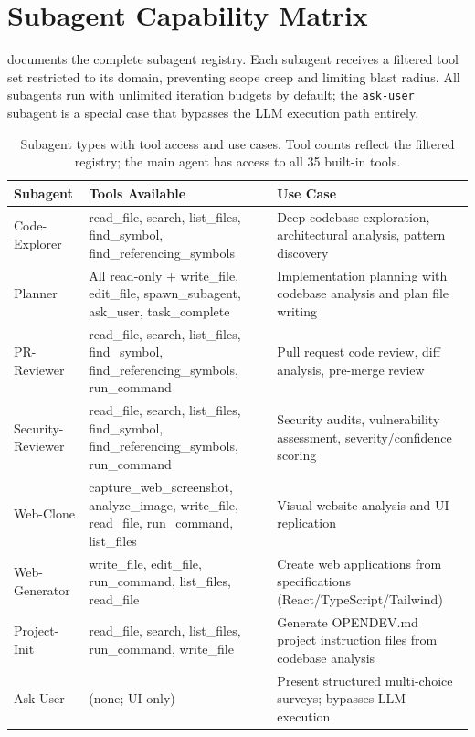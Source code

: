 \section{Subagent Capability Matrix}
\label{app:subagents}

 documents the complete subagent registry. Each subagent receives a filtered tool set restricted to its domain, preventing scope creep and limiting blast radius. All subagents run with unlimited iteration budgets by default; the \texttt{ask-user} subagent is a special case that bypasses the LLM execution path entirely.

\begin{table}[h]
\centering
\caption{Subagent types with tool access and use cases. Tool counts reflect the filtered registry; the main agent has access to all 35 built-in tools.}
\label{tab:subagents}
\footnotesize
\begin{tabular}{@{}lp{4.5cm}p{4.5cm}@{}}
\toprule
\textbf{Subagent} & \textbf{Tools Available} & \textbf{Use Case} \\
\midrule
Code-Explorer & read\_file, search, list\_files, find\_symbol, find\_referencing\_symbols & Deep codebase exploration, architectural analysis, pattern discovery \\
\addlinespace
Planner & All read-only + write\_file, edit\_file, spawn\_subagent, ask\_user, task\_complete & Implementation planning with codebase analysis and plan file writing \\
\addlinespace
PR-Reviewer & read\_file, search, list\_files, find\_symbol, find\_referencing\_symbols, run\_command & Pull request code review, diff analysis, pre-merge review \\
\addlinespace
Security-Reviewer & read\_file, search, list\_files, find\_symbol, find\_referencing\_symbols, run\_command & Security audits, vulnerability assessment, severity/confidence scoring \\
\addlinespace
Web-Clone & capture\_web\_screenshot, analyze\_image, write\_file, read\_file, run\_command, list\_files & Visual website analysis and UI replication \\
\addlinespace
Web-Generator & write\_file, edit\_file, run\_command, list\_files, read\_file & Create web applications from specifications (React/TypeScript/Tailwind) \\
\addlinespace
Project-Init & read\_file, search, list\_files, run\_command, write\_file & Generate OPENDEV.md project instruction files from codebase analysis \\
\addlinespace
Ask-User & (none; UI only) & Present structured multi-choice surveys; bypasses LLM execution \\
\bottomrule
\end{tabular}
\end{table}

